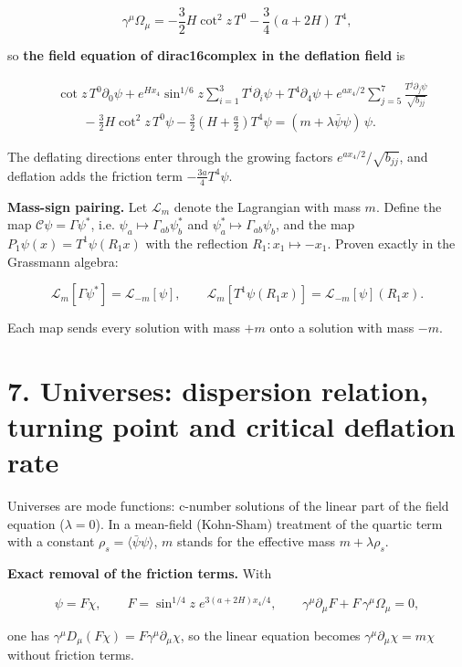 \documentclass[10pt]{article}
\makeatletter
\newcommand\keepnext{\par\nopagebreak\@nobreaktrue\everypar{\@nobreakfalse\everypar{}}}
\makeatother
\begin{document}
\[
\gamma^\mu\Omega_\mu = -\frac32H\cot^2 z\,T^0 - \frac34(a + 2H)\,T^4 ,
\]

so \textbf{the field equation of dirac16complex in the deflation field} is\keepnext


\[
\begin{aligned}
&\cot z\,T^0\partial_0\psi + e^{Hx_4}\sin^{1/6}z\sum_{i=1}^{3}T^i\partial_i\psi + T^4\partial_4\psi + e^{ax_4/2}\sum_{j=5}^{7}\frac{T^j\partial_j\psi}{\sqrt{b_{jj}}} \\
&\qquad - \frac32H\cot^2 z\,T^0\psi - \frac32\left(H + \frac a2\right)T^4\psi = (m + \lambda\bar\psi\psi)\,\psi .
\end{aligned}
\]

The deflating directions enter through the growing factors $e^{ax_4/2}/\sqrt{b_{jj}}$, and deflation adds the friction term $-\frac{3a}{4}T^4\psi$.


\textbf{Mass-sign pairing.} Let $\mathcal L_m$ denote the Lagrangian with mass $m$. Define the map $\mathcal C\psi = \Gamma\psi^*$, i.e. $\psi_a \mapsto \Gamma_{ab}\psi_b^*$ and $\psi_a^* \mapsto \Gamma_{ab}\psi_b$, and the map $P_1\psi(x) = T^1\psi(R_1x)$ with the reflection $R_1: x_1 \mapsto -x_1$. Proven exactly in the Grassmann algebra:\keepnext


\[
\mathcal L_m[\Gamma\psi^*] = \mathcal L_{-m}[\psi], \qquad \mathcal L_m[T^1\psi(R_1x)] = \mathcal L_{-m}[\psi](R_1x) .
\]

Each map sends every solution with mass $+m$ onto a solution with mass $-m$.


\section*{7. Universes: dispersion relation, turning point and critical deflation rate}

Universes are mode functions: c-number solutions of the linear part of the field equation ($\lambda = 0$). In a mean-field (Kohn-Sham) treatment of the quartic term with a constant $\rho_s = \langle\bar\psi\psi\rangle$, $m$ stands for the effective mass $m + \lambda\rho_s$.


\textbf{Exact removal of the friction terms.} With\keepnext


\[
\psi = F\chi, \qquad F = \sin^{1/4}z\;e^{3(a+2H)x_4/4}, \qquad \gamma^\mu\partial_\mu F + F\,\gamma^\mu\Omega_\mu = 0 ,
\]

one has $\gamma^\mu D_\mu(F\chi) = F\gamma^\mu\partial_\mu\chi$, so the linear equation becomes $\gamma^\mu\partial_\mu\chi = m\chi$ without friction terms.
\end{document}
